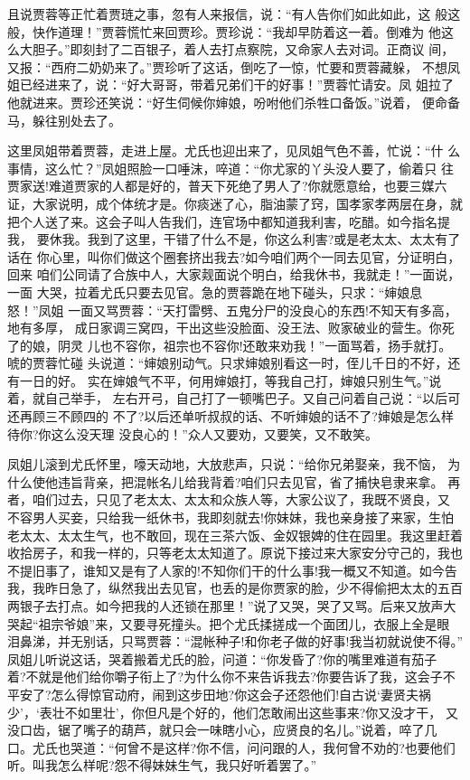 且说贾蓉等正忙着贾琏之事，忽有人来报信，说：“有人告你们如此如此，这
般这般，快作道理！”贾蓉慌忙来回贾珍。贾珍说：“我却早防着这一着。倒难为
他这么大胆子。”即刻封了二百银子，着人去打点察院，又命家人去对词。正商议
间，又报：“西府二奶奶来了。”贾珍听了这话，倒吃了一惊，忙要和贾蓉藏躲，
不想凤姐已经进来了，说：“好大哥哥，带着兄弟们干的好事！”贾蓉忙请安。凤
姐拉了他就进来。贾珍还笑说：“好生伺候你婶娘，吩咐他们杀牲口备饭。”说着，
便命备马，躲往别处去了。

这里凤姐带着贾蓉，走进上屋。尤氏也迎出来了，见凤姐气色不善，忙说：“什
么事情，这么忙？”凤姐照脸一口唾沫，啐道：“你尤家的丫头没人要了，偷着只
往贾家送!难道贾家的人都是好的，普天下死绝了男人了?你就愿意给，也要三媒六
证，大家说明，成个体统才是。你痰迷了心，脂油蒙了窍，国孝家孝两层在身，就
把个人送了来。这会子叫人告我们，连官场中都知道我利害，吃醋。如今指名提我，
要休我。我到了这里，干错了什么不是，你这么利害?或是老太太、太太有了话在
你心里，叫你们做这个圈套挤出我去?如今咱们两个一同去见官，分证明白，回来
咱们公同请了合族中人，大家觌面说个明白，给我休书，我就走！”一面说，一面
大哭，拉着尤氏只要去见官。急的贾蓉跪在地下碰头，只求：“婶娘息怒！”凤姐
一面又骂贾蓉：“天打雷劈、五鬼分尸的没良心的东西!不知天有多高，地有多厚，
成日家调三窝四，干出这些没脸面、没王法、败家破业的营生。你死了的娘，阴灵
儿也不容你，祖宗也不容你!还敢来劝我！”一面骂着，扬手就打。唬的贾蓉忙碰
头说道：“婶娘别动气。只求婶娘别看这一时，侄儿千日的不好，还有一日的好。
实在婶娘气不平，何用婶娘打，等我自己打，婶娘只别生气。”说着，就自己举手，
左右开弓，自己打了一顿嘴巴子。又自己问着自己说：“以后可还再顾三不顾四的
不了?以后还单听叔叔的话、不听婶娘的话不了?婶娘是怎么样待你?你这么没天理
没良心的！”众人又要劝，又要笑，又不敢笑。

凤姐儿滚到尤氏怀里，嚎天动地，大放悲声，只说：“给你兄弟娶亲，我不恼，
为什么使他违旨背亲，把混帐名儿给我背着?咱们只去见官，省了捕快皂隶来拿。
再者，咱们过去，只见了老太太、太太和众族人等，大家公议了，我既不贤良，又
不容男人买妾，只给我一纸休书，我即刻就去!你妹妹，我也亲身接了来家，生怕
老太太、太太生气，也不敢回，现在三茶六饭、金奴银婢的住在园里。我这里赶着
收拾房子，和我一样的，只等老太太知道了。原说下接过来大家安分守己的，我也
不提旧事了，谁知又是有了人家的!不知你们干的什么事!我一概又不知道。如今告
我，我昨日急了，纵然我出去见官，也丢的是你贾家的脸，少不得偷把太太的五百
两银子去打点。如今把我的人还锁在那里！”说了又哭，哭了又骂。后来又放声大
哭起“祖宗爷娘”来，又要寻死撞头。把个尤氏揉搓成一个面团儿，衣服上全是眼
泪鼻涕，并无别话，只骂贾蓉：“混帐种子!和你老子做的好事!我当初就说使不得。”
凤姐儿听说这话，哭着搬着尤氏的脸，问道：“你发昏了?你的嘴里难道有茄子
着?不就是他们给你嚼子衔上了?为什么你不来告诉我去?你要告诉了我，这会子不
平安了?怎么得惊官动府，闹到这步田地?你这会子还怨他们!自古说‘妻贤夫祸
少’，‘表壮不如里壮’，你但凡是个好的，他们怎敢闹出这些事来?你又没才干，
又没口齿，锯了嘴子的葫芦，就只会一味瞎小心，应贤良的名儿。”说着，啐了几
口。尤氏也哭道：“何曾不是这样?你不信，问问跟的人，我何曾不劝的?也要他们
听。叫我怎么样呢?怨不得妹妹生气，我只好听着罢了。”

